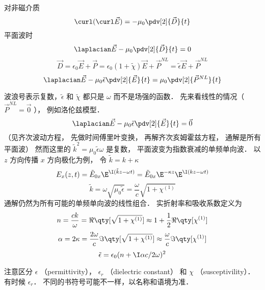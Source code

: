 
对非磁介质
\begin{equation}
\curl (\curl \vec E) = -\mu_0 \pdv[2]{\vec D}{t}
\end{equation}
平面波时
\begin{equation}
\laplacian \vec E - \mu_0 \pdv[2]{\vec D}{t} = 0
\end{equation}
\begin{equation}
\vec D = \epsilon_0 \vec E + \vec P = \epsilon_0(1 + \tilde\chi)\vec E + \vec P^{NL} = \tilde \epsilon \vec E + \vec P^{NL}
\end{equation}
\begin{equation}
\laplacian\vec E - \mu_0\tilde\epsilon \pdv[2]{\vec E}{t} = \mu_0 \pdv[2]{\vec P^{NL}}{t}
\end{equation}
 
波浪号表示复数，$\tilde\epsilon$ 和 $\tilde\chi$ 都只是 $\omega$ 而不是场强的函数． 先来看线性的情况（ $\vec P^{NL} = \vec 0$ ）， 例如洛伦兹模型．
\begin{equation}
\laplacian\vec E - \mu_0 \tilde\epsilon \pdv[2]{\vec E}{t} = \vec 0
\end{equation}
（见齐次波动方程， 先做时间傅里叶变换， 再解齐次亥姆霍兹方程， 通解是所有平面波） 然而这里的 $\tilde k^2 = \mu_0 \tilde \epsilon \omega$ 是复数， 平面波变为指数衰减的单频单向波． 以 $z$ 方向传播 $x$ 方向极化为例， 令  $\tilde k = k + \kappa$
\begin{equation}
E_x(z,t) = \tilde E_{0x} \E^{\I(\tilde kz - \omega t)} = \tilde E_{0x} \E^{-\kappa z} \E^{\I(kz - \omega t)}
\end{equation}
\begin{equation}
\tilde k = \omega \sqrt{\mu_0\tilde\epsilon} = \frac{\omega }{c}\sqrt {1 + \chi ^{(1)}}
\end{equation}
通解仍然为所有可能的单频单向波的线性组合． 实折射率和吸收系数定义为
\begin{equation}
n = \frac{ck}{\omega } = \Re\qty[\sqrt{1 + \chi ^{(1)}}] \approx 1 + \frac12 \Re\qty[\chi^{(1)}]
\end{equation}
\begin{equation}
\alpha  = 2\kappa  = \frac{2\omega}{c} \Im\qty[\sqrt{1+\chi^{(1)}}] \approx \frac{\omega}{c}\Im\qty[\chi ^{(1)}]
\end{equation}
\begin{equation}
\tilde \epsilon  = \epsilon_0 (n + \I \alpha c/2\omega )^2
\end{equation}
 
注意区分 $\epsilon$ （permittivity）， $\epsilon_r$ （dielectric constant） 和 $\chi$ （susceptivility）． 有时候 $\epsilon_r$． %
不同的书符号可能不一样，以名称和语境为准．

